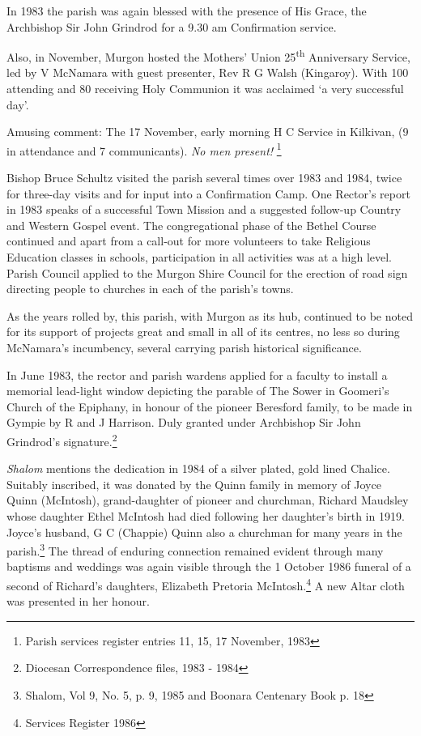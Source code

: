 In 1983 the parish was again blessed with the presence of His Grace, the Archbishop Sir John Grindrod for a 9.30 am Confirmation service.

Also, in November, Murgon hosted the Mothers' Union 25\textsuperscript{th} Anniversary Service, led by V McNamara with guest presenter, Rev R G Walsh (Kingaroy). With 100 attending and 80 receiving Holy Communion it was acclaimed `a very successful day'.

Amusing comment: The 17 November, early morning H C Service in Kilkivan, (9 in attendance and 7 communicants). \emph{No men present!} \footnote{Parish services register entries 11, 15, 17 November, 1983}

Bishop Bruce Schultz visited the parish several times over 1983 and 1984, twice for three-day visits and for input into a Confirmation Camp. One Rector's report in 1983 speaks of a successful Town Mission and a suggested follow-up Country and Western Gospel event. The congregational phase of the Bethel Course continued and apart from a call-out for more volunteers to take Religious Education classes in schools, participation in all activities was at a high level. Parish Council applied to the Murgon Shire Council for the erection of road sign directing people to churches in each of the parish's towns.

As the years rolled by, this parish, with Murgon as its hub, continued to be noted for its support of projects great and small in all of its centres, no less so during McNamara's incumbency, several carrying parish historical significance.

In June 1983, the rector and parish wardens applied for a faculty to install a memorial lead-light window depicting the parable of The Sower in Goomeri's Church of the Epiphany, in honour of the pioneer Beresford family, to be made in Gympie by R and J Harrison. Duly granted under Archbishop Sir John Grindrod's signature.\footnote{Diocesan Correspondence files, 1983 - 1984}

\emph{Shalom} mentions the dedication in 1984 of a silver plated, gold lined Chalice. Suitably inscribed, it was donated by the Quinn family in memory of Joyce Quinn (McIntosh), grand-daughter of pioneer and churchman, Richard Maudsley whose daughter Ethel McIntosh had died following her daughter's birth in 1919. Joyce's husband, G C (Chappie) Quinn also a churchman for many years in the parish.\footnote{Shalom, Vol 9, No. 5, p. 9, 1985 and Boonara Centenary Book p. 18} The thread of enduring connection remained evident through many baptisms and weddings was again visible through the 1 October 1986 funeral of a second of Richard's daughters, Elizabeth Pretoria McIntosh.\footnote{Services Register 1986} A new Altar cloth was presented in her honour.

